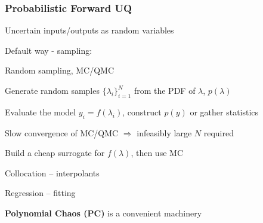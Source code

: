 \begin{frame}[t]\label{for-uq}
\frametitle{Probabilistic Forward UQ }

\bi\setlength{\itemsep}{3mm}

\item Uncertain inputs/outputs as random variables

\hspace*{4cm}

\item Default way - sampling:
\bi
 \setlength\itemsep{0.1cm}
\item Random sampling, MC/QMC
\item Generate random samples $\{\lambda_i\}_{i=1}^N$ from the PDF of $\lambda$, $p(\lambda)$
\item Evaluate the model $y_i=f(\lambda_i)$, construct $p(y)$ or gather statistics
\item Slow convergence of MC/QMC $\Rightarrow$ infeasibly large $N$ required
\ei

\item Build a cheap surrogate for $f(\lambda)$, then use MC

\bi
 \setlength\itemsep{0.1cm}
\item Collocation -- interpolants
\item Regression -- fitting
\ei
\item \textbf{Polynomial Chaos (PC)} is a convenient machinery


\ei

\end{frame}
